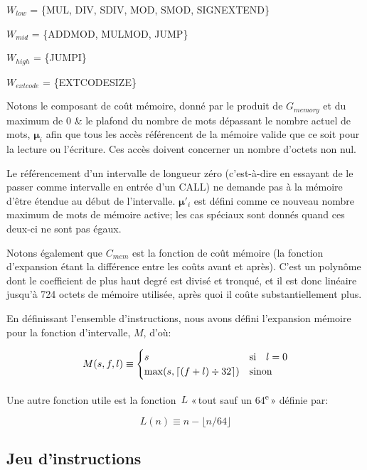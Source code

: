 \documentclass[9pt,oneside]{amsart}
\DeclarePairedDelimiter{\ceil}{\lceil}{\rceil}
\begin{document}
$W_{low}$ = \{{\small MUL}, {\small DIV}, {\small SDIV}, {\small MOD}, {\small SMOD}, {\small SIGNEXTEND}\}

$W_{mid}$ = \{{\small ADDMOD}, {\small MULMOD}, {\small JUMP}\}

$W_{high}$ = \{{\small JUMPI}\}

$W_{extcode}$ = \{{\small EXTCODESIZE}\}

Notons le composant de coût mémoire, donné par le produit de $G_{memory}$ et du maximum de 0 \& le plafond du nombre de mots
dépassant
le nombre actuel de mots, $\boldsymbol{\mu}_i$ afin que tous les accès référencent de la mémoire valide que ce soit pour la lecture ou l'écriture. Ces accès doivent concerner un nombre d'octets non nul.

Le référencement d'un intervalle de longueur zéro (c'est-à-dire en essayant de le passer comme intervalle en entrée d'un CALL) ne demande pas à la mémoire d'être étendue au début de l'intervalle. $\boldsymbol{\mu}'_i$ est défini comme ce nouveau nombre maximum de mots de mémoire active; les cas spéciaux sont donnés quand ces deux-ci ne sont pas égaux.

Notons également que $C_{mem}$ est la fonction de coût mémoire (la fonction d'expansion étant la différence entre les coûts avant et après). C'est un polynôme dont le coefficient de plus haut degré est divisé et tronqué, et il est donc linéaire jusqu'à 724 octets de mémoire utilisée, après quoi il coûte substantiellement plus.

En définissant l'ensemble d'instructions, nous avons défini l'expansion mémoire pour la fonction d'intervalle, $M$, d'où:

\begin{equation}
M(s, f, l) \equiv \begin{cases}
s & \text{si} \quad l = 0 \\
\max(s, \ceil{ (f + l) \div 32 }) & \text{sinon}
\end{cases}
\end{equation}

Une autre fonction utile est la fonction~$L$ «\,tout sauf un 64\textsuperscript{e}\,» définie par:

\begin{equation}
L(n) \equiv n - \lfloor n / 64 \rfloor
\end{equation}

\subsection{Jeu d'instructions}
\end{document}
